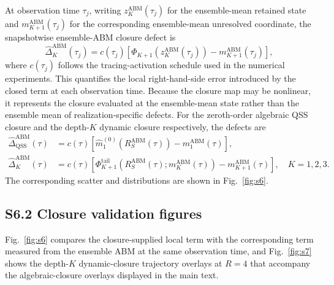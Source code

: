 \documentclass[11pt]{article}
\begin{document}
At observation time $\tau_j$, writing $z_K^{\mathrm{ABM}}(\tau_j)$ for the ensemble-mean retained state and $m_{K+1}^{\mathrm{ABM}}(\tau_j)$ for the corresponding ensemble-mean unresolved coordinate, the snapshotwise ensemble-ABM closure defect is
\begin{equation}
\widehat\Delta_K^{\mathrm{ABM}}(\tau_j) = c(\tau_j)\left[\Phi_{K+1}\!\left(z_K^{\mathrm{ABM}}(\tau_j)\right) - m_{K+1}^{\mathrm{ABM}}(\tau_j)\right],
\end{equation}
where $c(\tau_j)$ follows the tracing-activation schedule used in the numerical experiments. This quantifies the local right-hand-side error introduced by the closed term at each observation time. Because the closure map may be nonlinear, it represents the closure evaluated at the ensemble-mean state rather than the ensemble mean of realization-specific defects. For the zeroth-order algebraic QSS closure and the depth-$K$ dynamic closure respectively, the defects are
\begin{align}
\widehat\Delta_{\mathrm{QSS}}^{\mathrm{ABM}}(\tau) &= c(\tau)\left[\widehat m_1^{(0)}\!\left(R_S^{\mathrm{ABM}}(\tau)\right) - m_1^{\mathrm{ABM}}(\tau)\right], \\
\widehat\Delta_K^{\mathrm{ABM}}(\tau) &= c(\tau)\left[\Phi_{K+1}^{\mathrm{tail}}\!\left(R_S^{\mathrm{ABM}}(\tau);m_K^{\mathrm{ABM}}(\tau)\right) - m_{K+1}^{\mathrm{ABM}}(\tau)\right], \quad K=1,2,3.
\end{align}
The corresponding scatter and distributions are shown in Fig.~\ref{fig:s6}.

\subsection*{S6.2 Closure validation figures}
Fig.~\ref{fig:s6} compares the closure-supplied local term with the corresponding term measured from the ensemble ABM at the same observation time, and Fig.~\ref{fig:s7} shows the depth-$K$ dynamic-closure trajectory overlays at $R=4$ that accompany the algebraic-closure overlays displayed in the main text.
\end{document}
